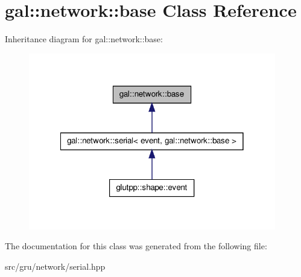 \hypertarget{classgal_1_1network_1_1base}{\section{gal\-:\-:network\-:\-:base \-Class \-Reference}
\label{classgal_1_1network_1_1base}
}


\-Inheritance diagram for gal\-:\-:network\-:\-:base\-:\nopagebreak
\begin{figure}[H]
\begin{center}
\leavevmode
\includegraphics[width=306pt]{classgal_1_1network_1_1base__inherit__graph}
\end{center}
\end{figure}


\-The documentation for this class was generated from the following file\-:\begin{DoxyCompactItemize}
\item 
src/gru/network/serial.\-hpp\end{DoxyCompactItemize}

